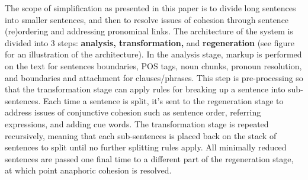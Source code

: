 {The scope of simplification as presented in this paper is to divide long sentences into smaller sentences, and then to resolve issues of cohesion through sentence (re)ordering and addressing pronominal links. The architecture of the system is divided into 3 steps:  \textbf{analysis, transformation,} and \textbf{regeneration} (see figure  for an illustration of the architecture).  In the analysis stage, markup is performed on the text for sentences boundaries, POS tags, noun chunks, pronoun resolution, and boundaries and attachment for clauses/phrases.  This step is pre-processing so that the transformation stage can apply rules for breaking up a sentence into sub-sentences.  Each time a sentence is split, it's sent to the regeneration stage to address issues of conjunctive cohesion such as sentence order, referring expressions, and adding cue words.  The transformation stage is repeated recursively, meaning that each sub-sentences is placed back on the stack of sentences to split until no further splitting rules apply.  All minimally reduced sentences are passed one final time to a different part of the regeneration stage, at which point anaphoric cohesion is resolved.}

